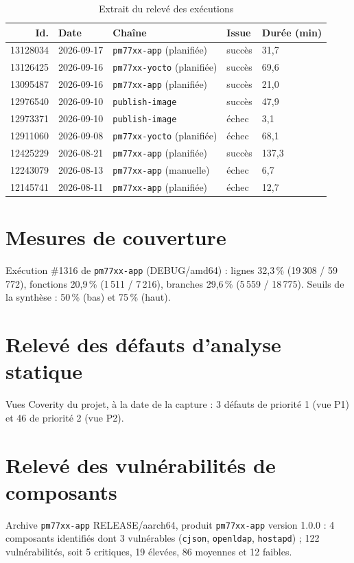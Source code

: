 \begin{table}[H]
\centering
\caption{Extrait du relevé des exécutions}
\label{tab:ann-executions}
\small
\begin{tabular}{@{}rllll@{}}
\toprule
\textbf{Id.} & \textbf{Date} & \textbf{Chaîne} & \textbf{Issue} & \textbf{Durée (min)} \\
\midrule
13128034 & 2026-09-17 & \texttt{pm77xx-app} (planifiée) & succès & 31,7 \\
13126425 & 2026-09-16 & \texttt{pm77xx-yocto} (planifiée) & succès & 69,6 \\
13095487 & 2026-09-16 & \texttt{pm77xx-app} (planifiée) & succès & 21,0 \\
12976540 & 2026-09-10 & \texttt{publish-image} & succès & 47,9 \\
12973371 & 2026-09-10 & \texttt{publish-image} & échec & 3,1 \\
12911060 & 2026-09-08 & \texttt{pm77xx-yocto} (planifiée) & échec & 68,1 \\
12425229 & 2026-08-21 & \texttt{pm77xx-app} (planifiée) & succès & 137,3 \\
12243079 & 2026-08-13 & \texttt{pm77xx-app} (manuelle) & échec & 6,7 \\
12145741 & 2026-08-11 & \texttt{pm77xx-app} (planifiée) & échec & 12,7 \\
\bottomrule
\end{tabular}
\end{table}

\section{Mesures de couverture}
\label{ann:releve-couverture}

Exécution \#1316 de \texttt{pm77xx-app} (DEBUG/amd64) : lignes 32,3\,\%
(19\,308 / 59\,772), fonctions 20,9\,\% (1\,511 / 7\,216), branches 29,6\,\%
(5\,559 / 18\,775). Seuils de la synthèse : 50\,\% (bas) et 75\,\% (haut).

\section{Relevé des défauts d'analyse statique}
\label{ann:releve-defauts}

Vues Coverity du projet, à la date de la capture : 3 défauts de priorité 1
(vue P1) et 46 de priorité 2 (vue P2).

\section{Relevé des vulnérabilités de composants}
\label{ann:releve-vulns}

Archive \texttt{pm77xx-app} RELEASE/aarch64, produit \texttt{pm77xx-app} version
1.0.0 : 4 composants identifiés dont 3 vulnérables (\texttt{cjson},
\texttt{openldap}, \texttt{hostapd}) ; 122 vulnérabilités, soit 5 critiques,
19 élevées, 86 moyennes et 12 faibles.
